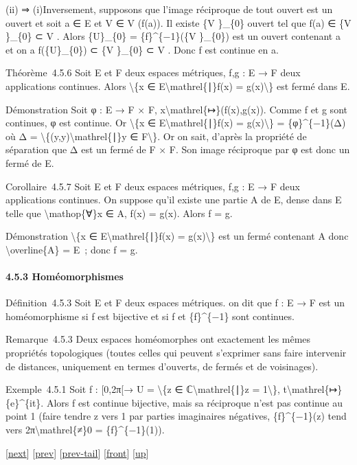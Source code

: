 \documentclass[]{article}
\begin{document}
(ii) ⇒ (i)Inversement, supposons que l'image réciproque de tout ouvert
est un ouvert et soit a ∈ E et V ∈ V (f(a)). Il existe \{V \}\_\{0\}
ouvert tel que f(a) ∈ \{V \}\_\{0\} ⊂ V . Alors \{U\}\_\{0\} =
\{f\}\^{}\{−1\}(\{V \}\_\{0\}) est un ouvert contenant a et on a
f(\{U\}\_\{0\}) ⊂ \{V \}\_\{0\} ⊂ V . Donc f est continue en a.

Théorème~4.5.6 Soit E et F deux espaces métriques, f,g : E → F deux
applications continues. Alors \textbackslash{}\{x ∈
E\textbackslash{}mathrel\{∣\}f(x) = g(x)\textbackslash{}\} est fermé
dans E.

Démonstration Soit φ : E → F × F,
x\textbackslash{}mathrel\{↦\}(f(x),g(x)). Comme f et g sont continues, φ
est continue. Or \textbackslash{}\{x ∈ E\textbackslash{}mathrel\{∣\}f(x)
= g(x)\textbackslash{}\} = \{φ\}\^{}\{−1\}(Δ) où Δ =
\textbackslash{}\{(y,y)\textbackslash{}mathrel\{∣\}y ∈
F\textbackslash{}\}. Or on sait, d'après la propriété de séparation que
Δ est un fermé de F × F. Son image réciproque par φ est donc un fermé de
E.

Corollaire~4.5.7 Soit E et F deux espaces métriques, f,g : E → F deux
applications continues. On suppose qu'il existe une partie A de E, dense
dans E telle que \textbackslash{}mathop\{∀\}x ∈ A, f(x) = g(x). Alors f
= g.

Démonstration \textbackslash{}\{x ∈ E\textbackslash{}mathrel\{∣\}f(x) =
g(x)\textbackslash{}\} est un fermé contenant A donc
\textbackslash{}overline\{A\} = E~; donc f = g.

\paragraph{4.5.3 Homéomorphismes}

Définition~4.5.3 Soit E et F deux espaces métriques. on dit que f : E →
F est un homéomorphisme si f est bijective et si f et \{f\}\^{}\{−1\}
sont continues.

Remarque~4.5.3 Deux espaces homéomorphes ont exactement les mêmes
propriétés topologiques (toutes celles qui peuvent s'exprimer sans faire
intervenir de distances, uniquement en termes d'ouverts, de fermés et de
voisinages).

Exemple~4.5.1 Soit f : {[}0,2π{[}→ U = \textbackslash{}\{z ∈
ℂ\textbackslash{}mathrel\{∣\}\textbar{}z\textbar{} =
1\textbackslash{}\}, t\textbackslash{}mathrel\{↦\}\{e\}\^{}\{it\}. Alors
f est continue bijective, mais sa réciproque n'est pas continue au point
1 (faire tendre z vers 1 par parties imaginaires négatives,
\{f\}\^{}\{−1\}(z) tend vers 2π\textbackslash{}mathrel\{≠\}0 =
\{f\}\^{}\{−1\}(1)).

{[}\href{coursse23.html}{next}{]} {[}\href{coursse21.html}{prev}{]}
{[}\href{coursse21.html\#tailcoursse21.html}{prev-tail}{]}
{[}\href{coursse22.html}{front}{]}
{[}\href{coursch5.html\#coursse22.html}{up}{]}
\end{document}
